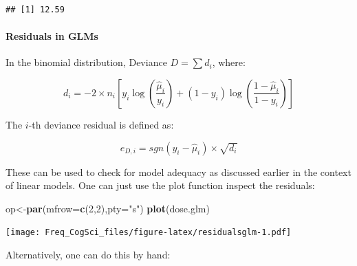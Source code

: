 \documentclass[12pt,]{krantz}
\newenvironment{Shaded}{\begin{snugshade}}{\end{snugshade}}
\newcommand{\DataTypeTok}[1]{\textcolor[rgb]{0.13,0.29,0.53}{#1}}
\newcommand{\DecValTok}[1]{\textcolor[rgb]{0.00,0.00,0.81}{#1}}
\newcommand{\KeywordTok}[1]{\textcolor[rgb]{0.13,0.29,0.53}{\textbf{#1}}}
\newcommand{\NormalTok}[1]{#1}
\newcommand{\OperatorTok}[1]{\textcolor[rgb]{0.81,0.36,0.00}{\textbf{#1}}}
\newcommand{\StringTok}[1]{\textcolor[rgb]{0.31,0.60,0.02}{#1}}
\let\oldparagraph\paragraph
\renewcommand{\paragraph}[1]{\oldparagraph{#1}\mbox{}}
\begin{document}
\begin{verbatim}
## [1] 12.59
\end{verbatim}

\hypertarget{residuals-in-glms}{%
\paragraph{Residuals in GLMs}\label{residuals-in-glms}}

In the binomial distribution, Deviance \(D=\sum d_i\), where:

\begin{equation}
d_i = -2 \times n_i [ y_i \log(\frac{\hat{\mu}_i}{y_i}) + (1-y_i) \log (\frac{1-\hat{\mu}_i}{1-y_i}) ]  
\end{equation}

The \(i\)-th deviance residual is defined as:

\begin{equation}
  e_{D,i}= sgn(y_i-\hat{\mu}_i) \times \sqrt{d_i}
\end{equation}

These can be used to check for model adequacy as discussed earlier in the context of linear models.
One can just use the plot function inspect the residuals:

\begin{Shaded}
\begin{Highlighting}[]
\NormalTok{op<-}\KeywordTok{par}\NormalTok{(}\DataTypeTok{mfrow=}\KeywordTok{c}\NormalTok{(}\DecValTok{2}\NormalTok{,}\DecValTok{2}\NormalTok{),}\DataTypeTok{pty=}\StringTok{"s"}\NormalTok{)}
\KeywordTok{plot}\NormalTok{(dose.glm)}
\end{Highlighting}
\end{Shaded}

\texttt{[image: Freq\_CogSci\_files/figure-latex/residualsglm-1.pdf]}

Alternatively, one can do this by hand:

\begin{Shaded}
\end{Shaded}
\end{document}
